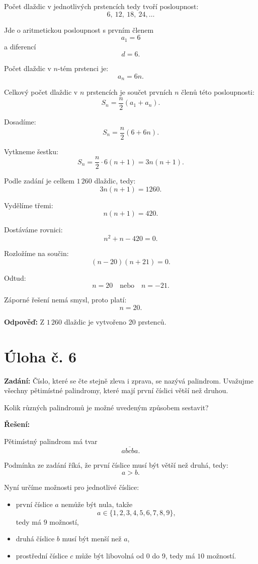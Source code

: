 \documentclass[12pt,a4paper]{article}
\begin{document}
Počet dlaždic v jednotlivých prstencích tedy tvoří posloupnost:
\[
6,\ 12,\ 18,\ 24,\dots
\]

Jde o aritmetickou posloupnost s prvním členem
\[
a_1=6
\]
a diferencí
\[
d=6.
\]

Počet dlaždic v \(n\)-tém prstenci je:
\[
a_n=6n.
\]

Celkový počet dlaždic v \(n\) prstencích je součet prvních \(n\) členů této posloupnosti:
\[
S_n=\frac{n}{2}(a_1+a_n).
\]

Dosadíme:
\[
S_n=\frac{n}{2}(6+6n).
\]

Vytkneme šestku:
\[
S_n=\frac{n}{2}\cdot 6(n+1)=3n(n+1).
\]

Podle zadání je celkem \(1\,260\) dlaždic, tedy:
\[
3n(n+1)=1260.
\]

Vydělíme třemi:
\[
n(n+1)=420.
\]

Dostáváme rovnici:
\[
n^2+n-420=0.
\]

Rozložíme na součin:
\[
(n-20)(n+21)=0.
\]

Odtud:
\[
n=20 \quad \text{nebo} \quad n=-21.
\]

Záporné řešení nemá smysl, proto platí:
\[
n=20.
\]

\bigskip

\textbf{Odpověď:}  
Z \(1\,260\) dlaždic je vytvořeno 20 prstenců.


\newpage
\section*{Úloha č. 6}

\textbf{Zadání:}  
Číslo, které se čte stejně zleva i zprava, se nazývá palindrom. Uvažujme všechny pětimístné palindromy, které mají první číslici větší než druhou.

Kolik různých palindromů je možné uvedeným způsobem sestavit?

\bigskip

\textbf{Řešení:}

Pětimístný palindrom má tvar
\[
\overline{abcba}.
\]

Podmínka ze zadání říká, že první číslice musí být větší než druhá, tedy:
\[
a>b.
\]

\medskip

Nyní určíme možnosti pro jednotlivé číslice:

\begin{itemize}
    \item první číslice \(a\) nemůže být nula, takže
    \[
    a\in\{1,2,3,4,5,6,7,8,9\},
    \]
    tedy má \(9\) možností,
    
    \item druhá číslice \(b\) musí být menší než \(a\),
    
    \item prostřední číslice \(c\) může být libovolná od 0 do 9, tedy má \(10\) možností.
\end{itemize}
\end{document}
